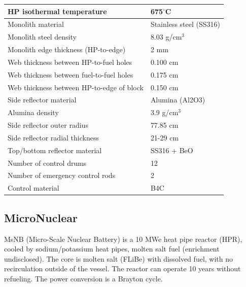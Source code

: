 \begin{table} [hbtp]
\begin{center}
\begin{tabular}{l     l}
HP isothermal temperature&675$^\circ{}$C        \\
\hline 
Monolith material&Stainless steel (SS316)       \\
Monolith steel density&8.03 g/cm$^3$                         \\
Monolith edge thickness (HP-to-edge)&2 mm                                 \\
Web thickness between HP-to-fuel holes&0.100 cm                            \\
Web thickness between fuel-to-fuel holes&0.175 cm                            \\
Web thickness between HP-to-edge of block&0.150 cm                            \\
\hline 
Side reflector material&Alumina (Al2O3)       \\
Alumina density&3.9 g/cm$^3$                        \\
Side reflector outer radius&77.85 cm                                 \\
Side reflector radial thickness&21-29 cm                            \\
Top/bottom reflector material&SS316 + BeO                            \\
\hline 
Number of control drums&12       \\
Number of emergency control rods&2       \\
Control material&B4C                        \\
\hline 

\end{tabular}
\end{center}
\end{table}

\pagebreak
\subsection{MicroNuclear}
MsNB  (Micro-Scale  Nuclear  Battery)  is  a  10  MWe  heat  pipe  reactor  (HPR),  cooled  by sodium/potassium heat pipes, molten salt fuel (enrichment undisclosed). The core is molten salt (FLiBe) with dissolved fuel,  with  no  recirculation  outside  of  the  vessel.  The  reactor  can  operate  10  years  without  refueling.  The  power conversion is a Brayton cycle.

